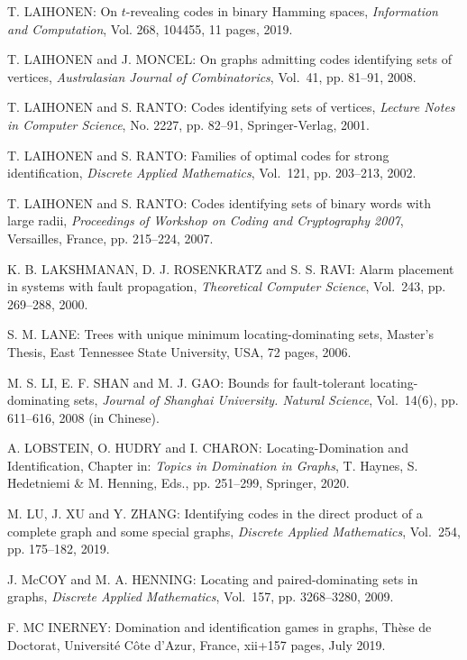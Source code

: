 \begin{thebibliography}{999}
T. LAIHONEN: On $t$-revealing codes in binary Hamming spaces, {\it Information and Computation}, Vol. 268, 104455, 11 pages, 2019.

T. LAIHONEN and J. MONCEL: On graphs admitting codes identifying sets of vertices, {\it Australasian Journal of Combinatorics}, Vol.~41, pp. 81--91, 2008.

T. LAIHONEN and S. RANTO: Codes identifying sets of vertices, {\it Lecture Notes in Computer Science}, No. 2227, pp. 82--91, Springer-Verlag, 2001.

T. LAIHONEN and S. RANTO: Families of optimal codes for strong identification, {\it Discrete Applied Mathematics}, Vol.~121, pp. 203--213, 2002.

T. LAIHONEN and S. RANTO: Codes identifying sets of binary words with large radii, {\it Proceedings of Workshop on Coding and Cryptography 2007}, Versailles, France, pp. 215--224, 2007.

K. B. LAKSHMANAN, D. J. ROSENKRATZ and S. S. RAVI: Alarm placement in systems with fault propagation, {\it Theoretical Computer Science}, Vol.~243, pp. 269--288, 2000.

S. M. LANE: Trees with unique minimum locating-dominating sets, Master's Thesis, East Tennessee State University, USA, 72 pages, 2006.

M. S. LI, E. F. SHAN and M. J. GAO: Bounds for fault-tolerant locating-dominating sets, {\it Journal of Shanghai University. Natural Science}, Vol.~14(6), pp. 611--616, 2008 (in Chinese).

A. LOBSTEIN, O. HUDRY and I. CHARON: Locating-Domination and Identification, Chapter in: {\it Topics in Domination in Graphs}, T. Haynes, S. Hedetniemi \& M. Henning, Eds., pp. 251--299, Springer, 2020.

M. LU, J. XU and Y. ZHANG: Identifying codes in the direct product of a complete graph and some special graphs, {\it Discrete Applied Mathematics}, Vol.~254, pp. 175--182, 2019.

J. McCOY and M. A. HENNING: Locating and paired-dominating sets in graphs, {\it Discrete Applied Mathematics}, Vol.~157, pp. 3268--3280, 2009.

F. MC INERNEY: Domination and identification games in graphs, Th\`ese de
Doctorat, Universit\'e C\^ote d'Azur, France, xii+157 pages, July 2019.


\end{thebibliography}

